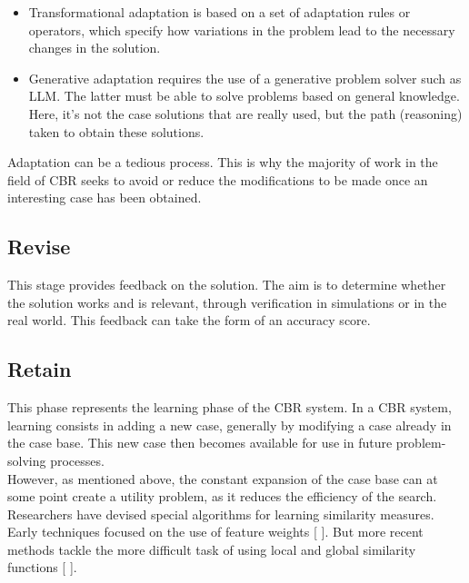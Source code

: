     \begin{itemize}
        \item Transformational adaptation is based on a set of adaptation rules or operators, which specify how variations in the problem lead to the necessary changes in the solution.  
        
        \item Generative adaptation requires the use of a generative problem solver such as LLM. The latter must be able to solve problems based on general knowledge. Here, it's not the case solutions that are really used, but the path (reasoning) taken to obtain these solutions. 
    \end{itemize}

    Adaptation can be a tedious process. This is why the majority of work in the field of CBR seeks to avoid or reduce the modifications to be made once an interesting case has been obtained.


    \subsection{Revise}
    This stage provides feedback on the solution. The aim is to determine whether the solution works and is relevant, through verification in simulations or in the real world. This feedback can take the form of an accuracy score.
    
    
    \subsection{Retain}
    This phase represents the learning phase of the CBR system. In a CBR system, learning consists in adding a new case, generally by modifying a case already in the case base. This new case then becomes available for use in future problem-solving processes.\\
    However, as mentioned above, the constant expansion of the case base can at some point create a utility problem, as it reduces the efficiency of the search. Researchers have devised special algorithms for learning similarity measures. Early techniques focused on the use of feature weights [ ]. But more recent methods tackle the more difficult task of using local and global similarity functions [ ]. 

    
    
